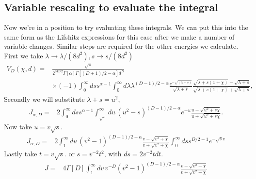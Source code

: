 \subsection{Variable rescaling to evaluate the integral}
Now we're in a position to try evaluating these integrals.
  We can put this into the same form as the Lifshitz expressions for this case after we make a number of variable changes.
  Similar steps are required for the other energies we calculate.  
First we take $\lambda \rightarrow \lambda/(8d^2), s\rightarrow s/(8d^2)$
\begin{align}
V_D(\chi,d)%
=&\frac{\sqrt{\pi}}{2^{3D/2}\Gamma[\alpha]\Gamma\left[(D+1)/2-\alpha\right]d^D}\nonumber \\
&\times(-1)\int_0^\infty ds s^{\alpha-1}\int_0^\infty d\lambda \lambda^{(D-1)/2-\alpha}
\frac{e^{-\sqrt{(\lambda+s)}}}{\sqrt{\lambda+s}} 
\frac{\sqrt{\lambda+s(1+\chi)}-\sqrt{\lambda+s}}{\sqrt{\lambda+s(1+\chi)}+\sqrt{\lambda+s}},
\end{align}
Secondly we will substitute $\lambda +s = u^2$,
\begin{align}
J_{\alpha,D} %
=& 2\int_0^\infty ds s^{\alpha-1}\int_{\sqrt{s}}^\infty du\, (u^2-s)^{(D-1)/2-\alpha}e^{-u} 
\frac{u-\sqrt{u^2+s\chi}}{u+\sqrt{u^2+s\chi  }}.
\end{align}
Now take $u = v\sqrt{s}$.  
\begin{align}
J_{\alpha,D} %
=& 2\int_{1}^\infty du\,(v^2-1)^{(D-1)/2-\alpha}\frac{v-\sqrt{v^2+\chi}}{v+\sqrt{v^2+\chi  }}
\int_0^\infty ds s^{D/2-1}e^{-\sqrt{s}v}
\end{align}
Lastly take $t= v\sqrt{s}$.  or $s = v^{-2}t^2$, with $ds = 2v^{-2}t dt$.  
\begin{align}
J %
=& 4\Gamma[D]\int_{1}^\infty dv\,v^{-D}(v^2-1)^{(D-1)/2-\alpha}\frac{v-\sqrt{v^2+\chi}}{v+\sqrt{v^2+\chi  }}
\end{align}

